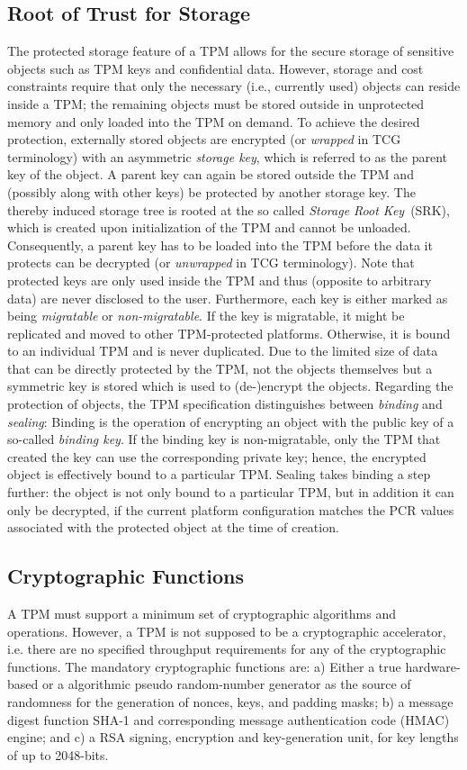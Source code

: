 \documentclass[runningheads]{llncs}
\begin{document}
\subsection{Root of Trust for Storage}
The protected storage feature of a TPM allows for the secure storage of
sensitive objects such as TPM keys and confidential data. However, storage
and cost constraints require that only the necessary (i.e., currently used)
objects can reside inside a TPM; the remaining objects must be stored outside
in unprotected memory and only loaded into the TPM on demand. To achieve the
desired protection, externally stored objects are encrypted (or \emph{wrapped}
in TCG terminology) with an asymmetric \emph{storage key}, which is referred
to as the parent key of the object. A parent key can again be stored outside
the TPM and (possibly along with other keys) be protected by another storage
key. The thereby induced storage tree is rooted at the so called \emph{Storage
Root Key}~(SRK), which is created upon initialization of the TPM and cannot
be unloaded. Consequently, a parent key has to be loaded into the TPM before
the data it protects can be decrypted (or \emph{unwrapped} in TCG terminology).
Note that protected keys are only used inside the TPM and thus (opposite to
arbitrary data) are never disclosed to the user. Furthermore, each key is
either marked as being \emph{migratable} or \emph{non-migratable}.
If the key is migratable, it might be replicated and moved to other
TPM-protected platforms. Otherwise, it is bound to an individual TPM and
is never duplicated. Due to the limited size of data that can be directly
protected by the TPM, not the objects themselves but a symmetric key is
stored which is used to (de-)encrypt the objects. Regarding the protection
of objects, the TPM specification distinguishes between \emph{binding} and
\emph{sealing}: Binding is the operation of encrypting an object with the
public key of a so-called \emph{binding key}. If the binding key is
non-migratable, only the TPM that created the key can use the corresponding
private key; hence, the encrypted object is effectively bound to a particular
TPM. Sealing takes binding a step further: the object is not only bound to
a particular TPM, but in addition it can only be decrypted, if the current
platform configuration matches the PCR values associated with the protected
object at the time of creation.

\subsection{Cryptographic Functions}
A TPM must support a minimum set of cryptographic algorithms and operations.
However, a TPM is not supposed to be a cryptographic accelerator, i.e. there
are no specified throughput requirements for any of the cryptographic
functions. The mandatory cryptographic functions are: a) Either a true
hardware-based or a algorithmic pseudo random-number generator as the
source of randomness for the generation of nonces, keys, and padding masks;
b) a message digest function SHA-1 and corresponding message authentication
code (HMAC) engine; and c) a RSA signing, encryption and key-generation unit,
for key lengths of up to 2048-bits.
\end{document}

